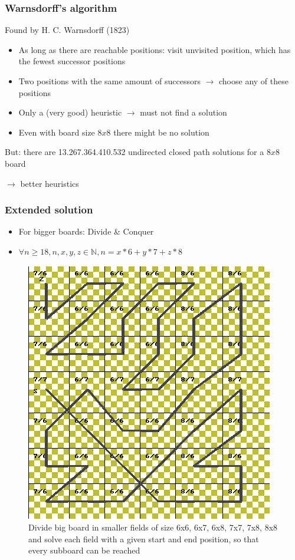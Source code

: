 \documentclass{beamer}
\begin{document}
\begin{frame}
\frametitle{Warnsdorff's algorithm}
Found by H. C. Warnsdorff (1823)\par
\begin{itemize}
	\item As long as there are reachable positions: visit unvisited position,
	which has the fewest successor positions
	\item Two positions with the same amount of successors $\rightarrow$
	choose any of these positions
	\item Only a (very good) heuristic $\rightarrow$ must not find a solution
	\item Even with board size $8x8$ there might be no solution
\end{itemize}

But: there are 13.267.364.410.532 undirected closed path solutions for a $8x8$ board

 $\rightarrow$ better heuristics 

\end{frame}

\begin{frame}
\frametitle{Extended solution}
\begin{itemize}
	\item For bigger boards: Divide \& Conquer
	\item $\forall n \geq 18, n, x, y, z \in \mathbb N, n = x*6 + y*7 + z * 8$
\end{itemize}

\begin{figure}
\includegraphics[scale=0.35]{spripic1}
\caption{Divide big board in smaller fields of size 6x6, 6x7, 6x8, 7x7, 7x8, 8x8
	and solve each field with a given start and end position, so that every subboard
	can be reached}
\end{figure}


\end{frame}
\end{document}
